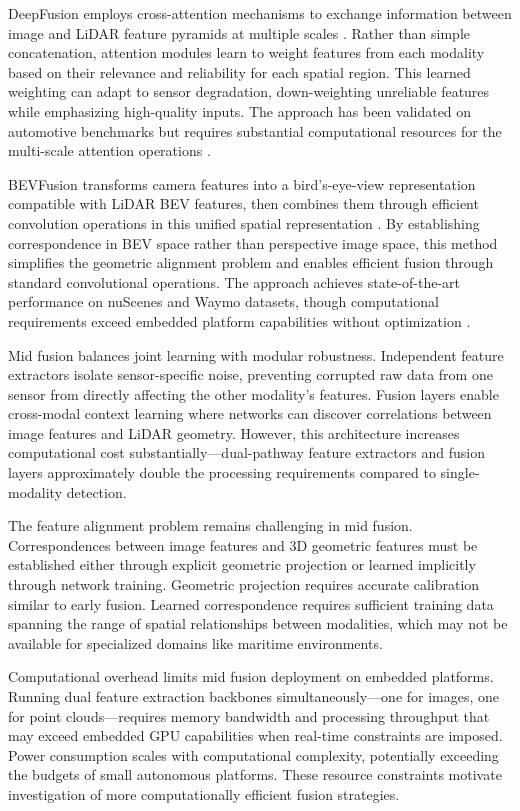 \documentclass[../main.tex]{subfiles}
\begin{document}
DeepFusion employs cross-attention mechanisms to exchange information between image and LiDAR feature pyramids at multiple scales \cite{cui2022}. Rather than simple concatenation, attention modules learn to weight features from each modality based on their relevance and reliability for each spatial region. This learned weighting can adapt to sensor degradation, down-weighting unreliable features while emphasizing high-quality inputs. The approach has been validated on automotive benchmarks but requires substantial computational resources for the multi-scale attention operations \cite{cui2022}.

BEVFusion transforms camera features into a bird's-eye-view representation compatible with LiDAR BEV features, then combines them through efficient convolution operations in this unified spatial representation \cite{liang2022, liu2023b}. By establishing correspondence in BEV space rather than perspective image space, this method simplifies the geometric alignment problem and enables efficient fusion through standard convolutional operations. The approach achieves state-of-the-art performance on nuScenes and Waymo datasets, though computational requirements exceed embedded platform capabilities without optimization \cite{liu2023b}.

Mid fusion balances joint learning with modular robustness. Independent feature extractors isolate sensor-specific noise, preventing corrupted raw data from one sensor from directly affecting the other modality's features. Fusion layers enable cross-modal context learning where networks can discover correlations between image features and LiDAR geometry. However, this architecture increases computational cost substantially—dual-pathway feature extractors and fusion layers approximately double the processing requirements compared to single-modality detection.

The feature alignment problem remains challenging in mid fusion. Correspondences between image features and 3D geometric features must be established either through explicit geometric projection or learned implicitly through network training. Geometric projection requires accurate calibration similar to early fusion. Learned correspondence requires sufficient training data spanning the range of spatial relationships between modalities, which may not be available for specialized domains like maritime environments.

Computational overhead limits mid fusion deployment on embedded platforms. Running dual feature extraction backbones simultaneously—one for images, one for point clouds—requires memory bandwidth and processing throughput that may exceed embedded GPU capabilities when real-time constraints are imposed. Power consumption scales with computational complexity, potentially exceeding the budgets of small autonomous platforms. These resource constraints motivate investigation of more computationally efficient fusion strategies.
\end{document}
